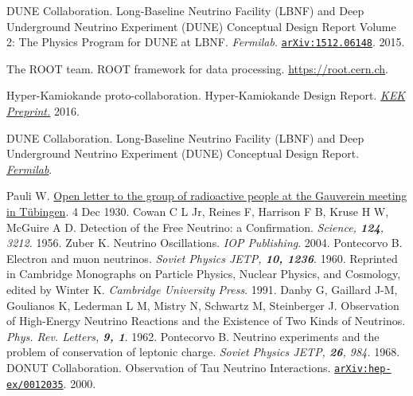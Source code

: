 \begin{thebibliography}{100}

	 DUNE Collaboration. Long-Baseline Neutrino Facility (LBNF) and
		Deep Underground Neutrino Experiment (DUNE) Conceptual Design Report Volume
		2: The Physics Program for DUNE at LBNF. \textit{Fermilab}.
		\href{https://arxiv.org/abs/1512.06148}{\texttt{arXiv:1512.06148}}. 2015.

	 The ROOT team. ROOT framework for data processing.
		\url{https://root.cern.ch}.

	 Hyper-Kamiokande proto-collaboration. Hyper-Kamiokande
		Design Report. \href{http://www.hyperk.org/?p=215}{\textit{KEK Preprint.}}
		2016.

	DUNE Collaboration. Long-Baseline Neutrino Facility (LBNF) and
		Deep Underground Neutrino Experiment (DUNE) Conceptual Design Report.
		\href{https://web.fnal.gov/project/LBNF/ReviewsAndAssessments/LBNF_DUNE\%20DOE\%20CD-1\%20Refresh\%20Review/SitePages/Conceptual\%20Design\%20Report.aspx}{\textit{Fermilab}}.



	 Pauli W.
		\href{http://microboone-docdb.fnal.gov/cgi-bin/RetrieveFile?docid=953;filename=pauli\%20letter1930.pdf}{Open letter to the group of radioactive people at the 
Gauverein meeting in Tübingen}. 4 Dec 1930.
	 Cowan C L Jr, Reines F, Harrison F B, Kruse H W, McGuire A D.
		Detection of the Free Neutrino: a Confirmation. \textit{Science,
		\textbf{124}, 3212.} 1956.
	 Zuber K. Neutrino
		Oscillations. \textit{IOP Publishing}. 2004.
	 Pontecorvo B. Electron and muon neutrinos.
		\textit{Soviet Physics JETP, \bf{10}, 1236}. 1960. Reprinted in
		Cambridge Monographs on Particle Physics, Nuclear Physics, and Cosmology,
		edited by Winter K. \textit{Cambridge University Press}. 1991.
	 Danby G, Gaillard J-M, Goulianos K, Lederman L M, Mistry N,
		Schwartz M, Steinberger J. Observation of High-Energy Neutrino Reactions
		and the Existence of Two Kinds of Neutrinos. \textit{Phys. Rev. Letters,
		\bf{9}, 1}. 1962.
	 Pontecorvo B. Neutrino experiments and the problem of
		conservation of leptonic charge. \textit{Soviet Physics JETP, \textbf{26},
		984.} 1968.
	 DONUT Collaboration. Observation of Tau Neutrino
		Interactions.
		\href{https://arxiv.org/abs/hep-ex/0012035}{\texttt{arXiv:hep-ex/0012035}}.
		2000.


\end{thebibliography}
